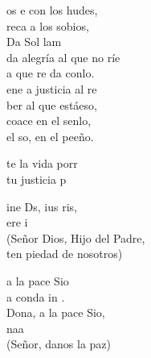 \documentclass[12pt]{article}
\begin{document}
\begin{multicols*}{2}
\begin{cancion}%
	os e con los hudes, \\
	reca a los sobios,\\
Da     Sol           lam\\
da alegría al que no ríe\\
	a que re da conlo.\\
\jump
	ene a  justicia al re\\
	ber al que estáeso,\\
	 coace en el senlo,\\
	 el so, en el peeño.\\
\end{cancion}%

\begin{cancion}%
	te la vida porr\\
	tu justicia p\\
\end{cancion}%

\begin{cancion}%
	ine Ds, ius ris,\\
	ere i\\
(Señor Dios, Hijo del Padre,\\
 ten piedad de nosotros)\\
\end{cancion}%

\begin{cancion}%
	a la pace Sio\\
	a  conda in .\\
	Dona, a la pace Sio,\\
	naa\\
(Señor, danos la paz)\\
\end{cancion}%


\end{multicols*}
\end{document}
